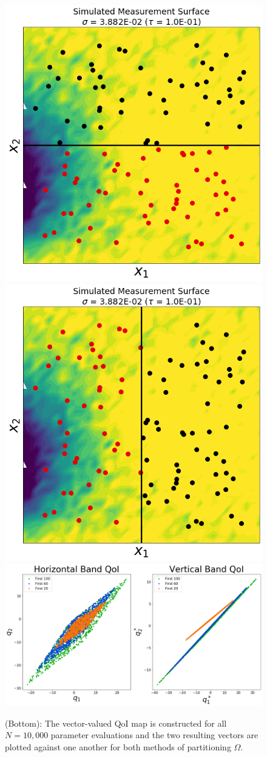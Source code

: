 \begin{figure}
\centering
  \includegraphics[width=0.475\linewidth]{figures/pde-highd/pde-highd_sensors_D2.png}
  \includegraphics[width=0.475\linewidth]{figures/pde-highd/pde-highd_sensors-alt_D2.png}
  \includegraphics[width=0.95\linewidth]{figures/pde-highd/pde-highd_geom_D2.png}
\caption{
(Bottom): The vector-valued QoI map is constructed for all $N=10,000$ parameter evaluations and the two resulting vectors are plotted against one another for both methods of partitioning $\Omega$.
}
\label{fig:pde-highd-2d-geometry}
\end{figure}

